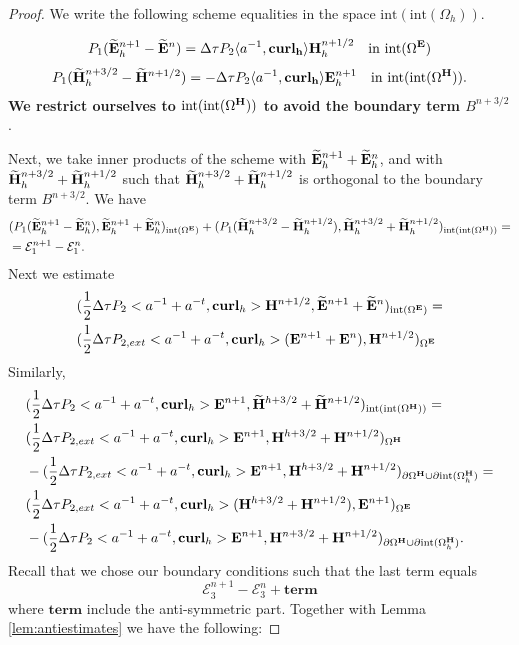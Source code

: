 \documentclass[12pt,reqno]{amsart}
\newcommand{\curl}{{\bf curl}}
\newcommand{\acurl}{\langle a^{-1},{\bf curl_h}\rangle}
\newcommand{\e}{{\bf E}}
\newcommand{\h}{{\bf H}}
\theoremstyle{definition}
\numberwithin{equation}{section}
\newcommand{\intr}[1]{\mathrm{int}(#1)}
\def\Gw{\Omega}     \def\Gx{\Xi}         \def\Gy{\Psi}
\def\Gwh{\Omega_h}
\begin{document}
\begin{proof}
	
	We write the following scheme equalities in the space $\intr{\intr\Gwh}$.
	
	\begin{align}
		P_1(\widetilde{\e}_h^{n+1} -\widetilde{\e}^{n})=
		\Delta \tau P_2 \acurl \h_h^{n+1/2} \quad \mathrm{in} \  \intr{\Gw^\e}
	\end{align}
	\begin{align}
		P_1(\widetilde{\h}_h^{n+3/2} -\widetilde{\h}^{n+1/2})
		=
		-\Delta \tau P_2 \acurl \e_h^{n+1}  \quad \mathrm{in} \  \intr{\intr{\Gw^\h}}.
	\end{align}
{ \bf
We restrict ourselves to $ \intr{\intr{\Gw^\h}}$ to avoid the boundary term $B^{n+3/2}$}.
	

	
	Next, we take inner products of the scheme with $\widetilde{\e}_h^{n+1}+\widetilde{\e}_h^n$,
	and with 
	$\widetilde{\h}_h^{n+3/2}+\widetilde{\h}_h^{n+1/2}$ such that 
	$\widetilde{\h}_h^{n+3/2}+\widetilde{\h}_h^{n+1/2}$ is orthogonal to the boundary term $B^{n+3/2}$.
We have
	\begin{align*}
		&
		(P_1(\widetilde{\e}^{n+1}_h-\widetilde{\e}^{n}_h),\widetilde{\e}^{n+1}_h+\widetilde{\e}^{n}_h)_{\intr{\Gw^\e}}+
		(P_1(\widetilde{\h}^{n+3/2}_h-\widetilde{\h}^{n+1/2}_h),\widetilde{\h}^{n+3/2}_h+\widetilde{\h}^{n+1/2}_h)_{\intr{\intr{\Gw^\h}}}=\\&
		=\mathcal{E}_1^{n+1}-\mathcal{E}_1^{n}.
	\end{align*}
	Next we estimate
	\begin{align*}
		&
		(\frac{1}{2}\Delta \tau P_2<a^{-1}+a^{-t},\curl_h>\h^{n+1/2},\widetilde{\e}^{n+1}+\widetilde{\e}^{n})_{ \intr{\Gw^\e}}=\\&
		(\frac{1}{2}\Delta \tau P_{2,ext}<a^{-1}+a^{-t},\curl_h>(\e^{n+1}+\e^{n}),\h^{n+1/2})_{ {\Gw^\e}}
	\end{align*}
	Similarly,
	\begin{align*}
		&
		(\frac{1}{2}\Delta \tau P_2<a^{-1}+a^{-t},\curl_h>\e^{n+1},\widetilde{\h}^{h+3/2}+\widetilde{\h}^{n+1/2})_{\intr{\intr{\Gw^\h}}}=\\&
		(\frac{1}{2}\Delta \tau P_{2,ext}<a^{-1}+a^{-t},\curl_h>\e^{n+1},\h^{h+3/2}+\h^{n+1/2})_{{\Gw^\h}}
		\\&
		-(\frac{1}{2}\Delta \tau P_{2,ext}<a^{-1}+a^{-t},\curl_h>\e^{n+1},\h^{h+3/2}+\h^{n+1/2})_{\partial{\Gw^\h}\cup \partial \intr{\Gwh^\h}}=\\&
		(\frac{1}{2}\Delta \tau P_{2,ext}<a^{-1}+a^{-t},\curl_h>(\h^{h+3/2}+\h^{n+1/2}),\e^{n+1})_{{{\Gw^\e}}}
		\\&
		-(\frac{1}{2}\Delta \tau P_{2}<a^{-1}+a^{-t},\curl_h>\e^{n+1},\h^{n+3/2}+\h^{n+1/2})_{\partial{\Gw^\h}\cup \partial \intr{\Gwh^\h}}.
	\end{align*}
	Recall that we chose our boundary conditions such that 
	the last term equals $$\mathcal{E}_3^{n+1}-\mathcal{E}_3^{n}+
	\mathbf{term}$$ where $\mathbf{term}$ include the anti-symmetric part.
	Together with Lemma \ref{lem:antiestimates} we have the following:


\end{proof}
\end{document}
